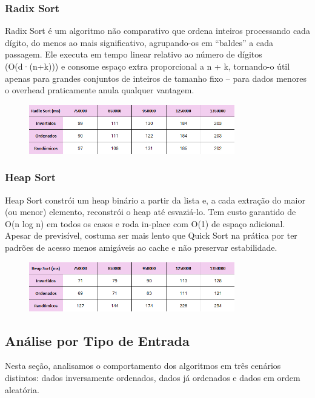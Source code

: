 \documentclass[a4paper, 12pt]{article}
\begin{document}
        \subsubsection{Radix Sort}
            Radix Sort é um algoritmo não comparativo que ordena inteiros processando cada dígito, do menos ao mais significativo, agrupando-os em “baldes” a cada passagem. Ele executa em tempo linear relativo ao número de dígitos (O(d·(n+k))) e consome espaço extra proporcional a n + k, tornando-o útil apenas para grandes conjuntos de inteiros de tamanho fixo – para dados menores o overhead praticamente anula qualquer vantagem.

            \begin{figure}[ht]
                \centering
                \includegraphics[width=0.8\textwidth]{images/radix.png}
            \end{figure}

        \subsubsection{Heap Sort}
            Heap Sort constrói um heap binário a partir da lista e, a cada extração do maior (ou menor) elemento, reconstrói o heap até esvaziá-lo. Tem custo garantido de O(n log n) em todos os casos e roda in-place com O(1) de espaço adicional. Apesar de previsível, costuma ser mais lento que Quick Sort na prática por ter padrões de acesso menos amigáveis ao cache e não preservar estabilidade.

            \begin{figure}[ht]
                \centering
                \includegraphics[width=0.8\textwidth]{images/heap.png}
            \end{figure}
    \subsection{Análise por Tipo de Entrada}
        Nesta seção, analisamos o comportamento dos algoritmos em três cenários distintos: dados inversamente ordenados, dados já ordenados e dados em ordem aleatória.
\end{document}
